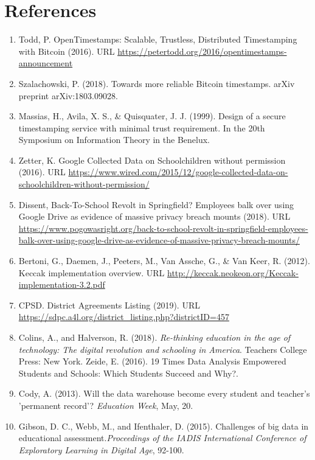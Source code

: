\documentclass{article}
\begin{document}
\section{References}
\begin{enumerate}
    \label{sec:1}
    \item Todd, P. OpenTimestamps: Scalable, Trustless, Distributed Timestamping with Bitcoin (2016). URL \url{https://petertodd.org/2016/opentimestamps-announcement}
    \label{sec:2}
    \item Szalachowski, P. (2018). Towards more reliable Bitcoin timestamps. arXiv preprint arXiv:1803.09028.
    \label{sec:3}
    \item Massias, H., Avila, X. S., \& Quisquater, J. J. (1999). Design of a secure timestamping service with minimal trust requirement. In the 20th Symposium on Information Theory in the Benelux.
    \label{sec:4}
    \item Zetter, K. Google Collected Data on Schoolchildren without permission (2016). URL \url{https://www.wired.com/2015/12/google-collected-data-on-schoolchildren-without-permission/}
    \label{sec:5}
    \item Dissent, Back-To-School Revolt in Springfield? Employees balk over using Google Drive as evidence of massive privacy breach mounts (2018).  URL \url{https://www.pogowasright.org/back-to-school-revolt-in-springfield-employees-balk-over-using-google-drive-as-evidence-of-massive-privacy-breach-mounts/}
    \label{sec:6}
    \item Bertoni, G., Daemen, J., Peeters, M., Van Assche, G., \& Van Keer, R. (2012). Keccak implementation overview. URL  \url{http://keccak.neokeon.org/Keccak-implementation-3.2.pdf}
    \label{sec:7}
    \item CPSD. District Agreements Listing (2019). URL  \url{https://sdpc.a4l.org/district_listing.php?districtID=457}
    \label{sec:8}
    \item Colins, A., and Halverson, R. (2018).\textit{ Re-thinking education in the age of technology: The digital revolution and schooling in America}. Teachers College Press: New York.
    \label{sec:9}
    Zeide, E. (2016). 19 Times Data Analysis Empowered Students and Schools: Which Students Succeed and Why?.
    \label{sec:10}
    \item Cody, A. (2013). Will the data warehouse become every student and teacher's 'permanent record'? \textit{Education Week}, May, 20.
    \label{sec:11}
    \item Gibson, D. C., Webb, M., and Ifenthaler, D. (2015). Challenges of big data in educational assessment.\textit{Proceedings of the IADIS International Conference of Exploratory Learning in Digital Age}, 92-100.

\end{enumerate}
\end{document}
